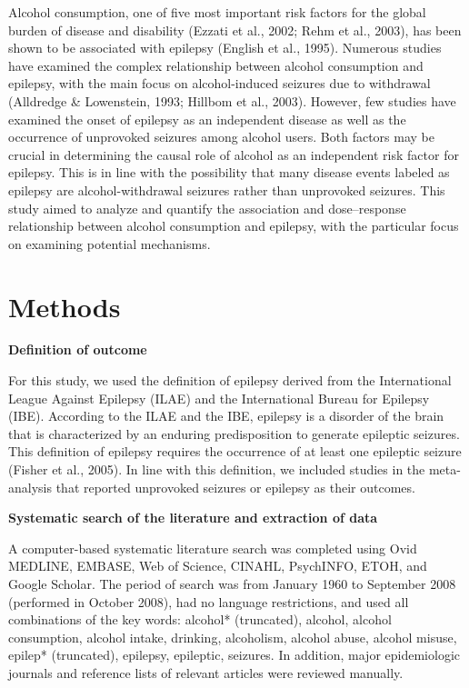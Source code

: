 \documentclass{article}
\begin{document}
Alcohol consumption, one of five most important risk factors for the global burden of disease and disability (Ezzati et al., 2002; Rehm et al., 2003), has been shown to be associated with epilepsy (English et al., 1995). Numerous studies have examined the complex relationship between alcohol consumption and epilepsy, with the main focus on alcohol-induced seizures due to withdrawal (Alldredge \& Lowenstein, 1993; Hillbom et al., 2003). However, few studies have examined the onset of epilepsy as an independent disease as well as the occurrence of unprovoked seizures among alcohol users. Both factors may be crucial in determining the causal role of alcohol as an independent risk factor for epilepsy. This is in line with the possibility that many disease events labeled as epilepsy are alcohol-withdrawal seizures rather than unprovoked seizures. This study aimed to analyze and quantify the association and dose–response relationship between alcohol consumption and epilepsy, with the particular focus on examining potential mechanisms.


\section*{Methods}
\textbf{Definition of outcome}


For this study, we used the definition of epilepsy derived from the International League Against Epilepsy (ILAE) and the International Bureau for Epilepsy (IBE). According to the ILAE and the IBE, epilepsy is a disorder of the brain that is characterized by an enduring predisposition to generate epileptic seizures. This definition of epilepsy requires the occurrence of at least one epileptic seizure (Fisher et al., 2005). In line with this definition, we included studies in the meta-analysis that reported unprovoked seizures or epilepsy as their outcomes.

\textbf{Systematic search of the literature and extraction of data}


A computer-based systematic literature search was completed using Ovid MEDLINE, EMBASE, Web of Science, CINAHL, PsychINFO, ETOH, and Google Scholar. The period of search was from January 1960 to September 2008 (performed in October 2008), had no language restrictions, and used all combinations of the key words: alcohol* (truncated), alcohol, alcohol consumption, alcohol intake, drinking, alcoholism, alcohol abuse, alcohol misuse, epilep* (truncated), epilepsy, epileptic, seizures. In addition, major epidemiologic journals and reference lists of relevant articles were reviewed manually.
\end{document}
